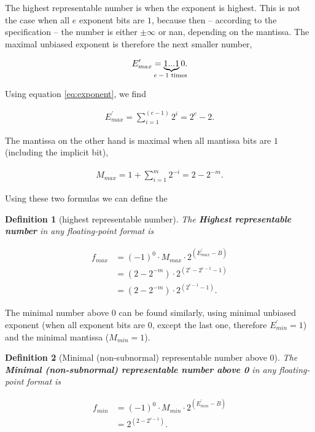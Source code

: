 \documentclass{article}
\theoremstyle{plain} %
\newtheorem{definition}{Definition}[section]
\theoremstyle{convention} %
\theoremstyle{remark} %
\def\df#1{\textbf{\textit{#1}}}
\numberwithin{equation}{section}
\begin{document}

The highest representable number is when the exponent is highest. This is not the case when all $e$ exponent bits are $1$, because then -- according to the specification \cite{ieee754_1985} -- the number is either $\pm \infty$ or \acrfull{nan}, depending on the mantissa. The maximal unbiased exponent is therefore the next smaller number,

\begin{align*}
    E^{\prime}_{max} = \underbrace{ 1...1 }_{\text{\makebox[0pt]{$e-1$ times} }}0.
\end{align*}

Using equation \eqref{eq:exponent}, we find

\begin{align*}
    E^{\prime}_{max} = \sum_{i=1}^{(e-1)} 2^i = 2^e -2.
\end{align*}

The mantissa on the other hand is maximal when all mantissa bits are $1$ (including the implicit bit),

\begin{align*}
    M_{max} = 1 + \sum_{i=1}^{m} 2^{-i} = 2 - 2^{-m}.
\end{align*}

Using these two formulas we can define the

\begin{definition}[highest representable number]

The \df{Highest representable number} in any floating-point format is

\begin{align*}
    f_{max} &= (-1)^0 \cdot M_{max} \cdot 2^{(E^{\prime}_{max} - B)} \\
            &= ( 2 - 2^{-m} ) \cdot 2^{(2^e -2^{e-1} -1)} \\
            &= ( 2 - 2^{-m} ) \cdot 2^{(2^{e-1} -1)}.
\end{align*}

\end{definition}

The minimal number above \num{0} can be found similarly, using minimal unbiased exponent (when all exponent bits are \num{0}, except the last one, therefore $E^{\prime}_{min} = 1$) and the minimal mantissa ($M_{min} = 1$).

\begin{definition}[Minimal (non-subnormal) representable number above \num{0}]

The \df{Minimal (non-subnormal) representable number above \num{0}} in any floating-point format is

\begin{align*}
    f_{min} &= (-1)^0 \cdot M_{min} \cdot 2^{(E^{\prime}_{min} - B)} \\
            &= 2^{(2 - 2^{e-1})}.
\end{align*}

\end{definition}
\end{document}
